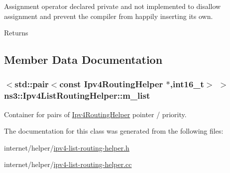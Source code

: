 Assignment operator declared private and not implemented to disallow assignment and prevent the compiler from happily inserting its own. 

\begin{DoxyReturn}{Returns}

\end{DoxyReturn}


\subsection{Member Data Documentation}
\subsubsection[{\texorpdfstring{m\+\_\+list}{m_list}}]{$<$std\+::pair$<$const {\bf Ipv4\+Routing\+Helper} $\ast$,int16\+\_\+t$>$ $>$ ns3\+::\+Ipv4\+List\+Routing\+Helper\+::m\+\_\+list\hspace{0.3cm}{\ttfamily [private]}}\hypertarget{classns3_1_1Ipv4ListRoutingHelper_acfed5974e83539a5daafa1ab6c388d3e}{}\label{classns3_1_1Ipv4ListRoutingHelper_acfed5974e83539a5daafa1ab6c388d3e}


Container for pairs of \hyperlink{classns3_1_1Ipv4RoutingHelper}{Ipv4\+Routing\+Helper} pointer / priority. 



The documentation for this class was generated from the following files\+:\begin{DoxyCompactItemize}
\item 
internet/helper/\hyperlink{ipv4-list-routing-helper_8h}{ipv4-\/list-\/routing-\/helper.\+h}\item 
internet/helper/\hyperlink{ipv4-list-routing-helper_8cc}{ipv4-\/list-\/routing-\/helper.\+cc}\end{DoxyCompactItemize}

